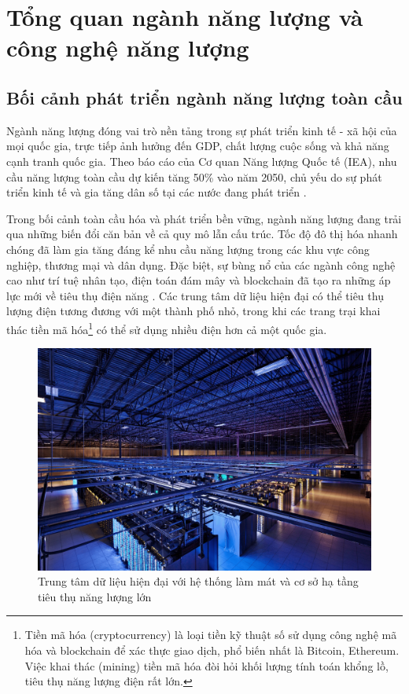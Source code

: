 \documentclass[../main.tex]{subfiles}
\begin{document}
\section{Tổng quan ngành năng lượng và công nghệ năng lượng}
\label{sec:energy_overview_practical_basis}

\subsection{Bối cảnh phát triển ngành năng lượng toàn cầu}
\label{sec:global_energy_development_context}

Ngành năng lượng đóng vai trò nền tảng trong sự phát triển kinh tế - xã hội của mọi quốc gia, trực tiếp ảnh hưởng đến GDP, chất lượng cuộc sống và khả năng cạnh tranh quốc gia. Theo báo cáo của Cơ quan Năng lượng Quốc tế (IEA), nhu cầu năng lượng toàn cầu dự kiến tăng 50\% vào năm 2050, chủ yếu do sự phát triển kinh tế và gia tăng dân số tại các nước đang phát triển \cite{iea2023world}.

Trong bối cảnh toàn cầu hóa và phát triển bền vững, ngành năng lượng đang trải qua những biến đổi căn bản về cả quy mô lẫn cấu trúc. Tốc độ đô thị hóa nhanh chóng đã làm gia tăng đáng kể nhu cầu năng lượng trong các khu vực công nghiệp, thương mại và dân dụng. Đặc biệt, sự bùng nổ của các ngành công nghệ cao như trí tuệ nhân tạo, điện toán đám mây và blockchain đã tạo ra những áp lực mới về tiêu thụ điện năng \cite{iea2023digitalization}. Các trung tâm dữ liệu hiện đại có thể tiêu thụ lượng điện tương đương với một thành phố nhỏ, trong khi các trang trại khai thác tiền mã hóa\footnote{Tiền mã hóa (cryptocurrency) là loại tiền kỹ thuật số sử dụng công nghệ mã hóa và blockchain để xác thực giao dịch, phổ biến nhất là Bitcoin, Ethereum. Việc khai thác (mining) tiền mã hóa đòi hỏi khối lượng tính toán khổng lồ, tiêu thụ năng lượng điện rất lớn.} có thể sử dụng nhiều điện hơn cả một quốc gia.

\begin{figure}
    \centering
    \includegraphics[width=1\textwidth]{Hinhve/data_center_energy.png}
    \caption{Trung tâm dữ liệu hiện đại với hệ thống làm mát và cơ sở hạ tầng tiêu thụ năng lượng lớn}
    \label{fig:data_center_energy}
\end{figure}
\end{document}
